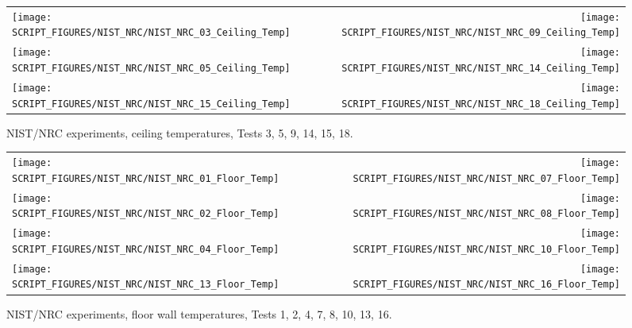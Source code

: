 \begin{figure}[p]
\begin{tabular*}{\textwidth}{l@{\extracolsep{\fill}}r}
\texttt{[image: SCRIPT\_FIGURES/NIST\_NRC/NIST\_NRC\_03\_Ceiling\_Temp]} &
\texttt{[image: SCRIPT\_FIGURES/NIST\_NRC/NIST\_NRC\_09\_Ceiling\_Temp]} \\
\texttt{[image: SCRIPT\_FIGURES/NIST\_NRC/NIST\_NRC\_05\_Ceiling\_Temp]} &
\texttt{[image: SCRIPT\_FIGURES/NIST\_NRC/NIST\_NRC\_14\_Ceiling\_Temp]} \\
\texttt{[image: SCRIPT\_FIGURES/NIST\_NRC/NIST\_NRC\_15\_Ceiling\_Temp]} &
\texttt{[image: SCRIPT\_FIGURES/NIST\_NRC/NIST\_NRC\_18\_Ceiling\_Temp]}
\end{tabular*}
\caption[NIST/NRC experiments, ceiling temperatures, Tests 3, 5, 9, 14, 15, 18]{NIST/NRC experiments, ceiling temperatures, Tests 3, 5, 9, 14, 15, 18.}
\label{NIST_NRC_Ceiling_Temp_Open}
\end{figure}

\begin{figure}[p]
\begin{tabular*}{\textwidth}{l@{\extracolsep{\fill}}r}
\texttt{[image: SCRIPT\_FIGURES/NIST\_NRC/NIST\_NRC\_01\_Floor\_Temp]} &
\texttt{[image: SCRIPT\_FIGURES/NIST\_NRC/NIST\_NRC\_07\_Floor\_Temp]} \\
\texttt{[image: SCRIPT\_FIGURES/NIST\_NRC/NIST\_NRC\_02\_Floor\_Temp]} &
\texttt{[image: SCRIPT\_FIGURES/NIST\_NRC/NIST\_NRC\_08\_Floor\_Temp]} \\
\texttt{[image: SCRIPT\_FIGURES/NIST\_NRC/NIST\_NRC\_04\_Floor\_Temp]} &
\texttt{[image: SCRIPT\_FIGURES/NIST\_NRC/NIST\_NRC\_10\_Floor\_Temp]} \\
\texttt{[image: SCRIPT\_FIGURES/NIST\_NRC/NIST\_NRC\_13\_Floor\_Temp]} &
\texttt{[image: SCRIPT\_FIGURES/NIST\_NRC/NIST\_NRC\_16\_Floor\_Temp]}
\end{tabular*}
\caption[NIST/NRC experiments, floor wall temperatures, Tests 1, 2, 4, 7, 8, 10, 13, 16]{NIST/NRC experiments, floor wall temperatures, Tests 1, 2, 4, 7, 8, 10, 13, 16.}
\label{NIST_NRC_Floor_Temp_Closed}
\end{figure}

